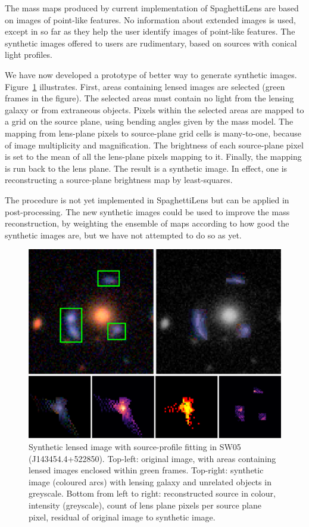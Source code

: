 \documentclass[fleqn,usenatbib]{mnras}
\newcommand{\figref}[1]{\ref{fig:#1}}
\begin{document}
The mass maps produced by current implementation of SpaghettiLens are
based on images of point-like features.  No information about extended
images is used, except in so far as they help the user identify images
of point-like features.  The synthetic images offered to users are
rudimentary, based on sources with conical light profiles.

We have now developed a prototype of better way to generate synthetic
images.  Figure~\figref{synthimg} illustrates.  First, areas
containing lensed images are selected (green frames in the figure).
The selected areas must contain no light from the lensing galaxy or
from extraneous objects.  Pixels within the selected areas are mapped
to a grid on the source plane, using bending angles given by the mass
model.  The mapping from lens-plane pixels to source-plane grid cells
is many-to-one, because of image multiplicity and magnification.  The
brightness of each source-plane pixel is set to the mean of all the
lens-plane pixels mapping to it.  Finally, the mapping is run back to
the lens plane.  The result is a synthetic image.  In effect, one is
reconstructing a source-plane brightness map by least-squares.

The procedure is not yet implemented in SpaghettiLens but can be
applied in post-processing.  The new synthetic images could be used to
improve the mass reconstruction, by weighting the ensemble of maps
according to how good the synthetic images are, but we have not
attempted to do so as yet.

\begin{figure}
  \includegraphics[width=\linewidth]{img/new_synth_img_detailed}
  \caption{Synthetic lensed image with source-profile fitting in SW05
    (J143454.4+522850). Top-left: original image, with areas
    containing lensed images enclosed within green frames.  Top-right:
    synthetic image (coloured arcs) with lensing galaxy and unrelated
    objects in greyscale.  Bottom from left to right: reconstructed
    source in colour, intensity (greyscale), count of lens plane
    pixels per source plane pixel, residual of original image to
    synthetic image.}
  \label{fig:synthimg}
\end{figure}
\end{document}

